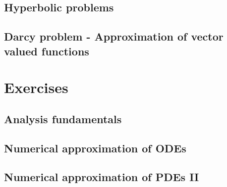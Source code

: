 \documentclass[palatino,twoside]{epflnotes}
\newif\ifincludefirstsemester
\begin{document}
\chapter{Hyperbolic problems}


\chapter{Darcy problem - Approximation of vector valued functions}
\ifincludefirstsemester\fi

\appendix
\part{Exercises}

\chapter{Analysis fundamentals}


\chapter{Numerical approximation of ODEs}


\chapter{Numerical approximation of PDEs II}


\backmatter



\printindex
\printtheorems
\end{document}
